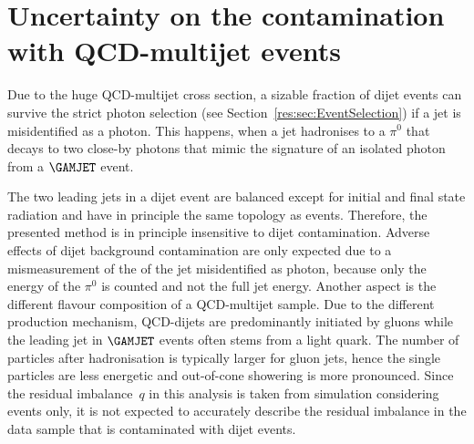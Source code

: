\section*{Uncertainty on the contamination with QCD-multijet events}
Due to the huge QCD-multijet cross section, a sizable fraction of dijet events can survive the strict photon selection (see Section~\ref{res:sec:EventSelection}) if a jet is misidentified as a photon.
This happens, when \eg a jet hadronises to a $\pi^0$ that decays to two close-by photons that mimic the signature of an isolated photon from a $\GAMJET$ event.

The two leading jets in a dijet event are balanced except for initial and final state radiation and have in principle the same topology as \GAMJET events.
Therefore, the presented method is in principle insensitive to dijet contamination.
Adverse effects of dijet background contamination are only expected due to a mismeasurement of the \pt of the jet misidentified as photon, because only the energy of the $\pi^0$ is counted and not the full jet energy.
Another aspect is the different flavour composition of a QCD-multijet sample. 
Due to the different production mechanism, QCD-dijets are predominantly initiated by gluons while the leading jet in $\GAMJET$ events often stems from a light quark.
The number of particles after hadronisation is typically larger for gluon jets, hence the single particles are less energetic and out-of-cone showering is more pronounced.
Since the residual imbalance~$q$ in this analysis is taken from simulation considering \GAMJET events only, it is not expected to accurately describe the residual imbalance in the data sample that is contaminated with dijet events.

